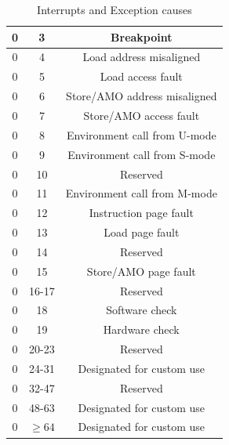 \begin{table}
\begin{tabular}{|c|c|c|}
    \hline
    0                  & 3             & Breakpoint                     \\
    \hline
    0                  & 4             & Load address misaligned        \\
    \hline
    0                  & 5             & Load access fault              \\
    \hline
    0                  & 6             & Store/AMO address misaligned   \\
    \hline
    0                  & 7             & Store/AMO access fault         \\
    \hline
    0                  & 8             & Environment call from U-mode   \\
    \hline
    0                  & 9             & Environment call from S-mode   \\
    \hline
    0                  & 10            & Reserved                       \\
    \hline
    0                  & 11            & Environment call from M-mode   \\
    \hline
    0                  & 12            & Instruction page fault         \\
    \hline
    0                  & 13            & Load page fault                \\
    \hline
    0                  & 14            & Reserved                       \\
    \hline
    0                  & 15            & Store/AMO page fault           \\
    \hline
    0                  & 16-17         & Reserved                       \\
    \hline
    0                  & 18            & Software check                 \\
    \hline
    0                  & 19            & Hardware check                 \\
    \hline
    0                  & 20-23         & Reserved                       \\
    \hline
    0                  & 24-31         & Designated for custom use      \\
    \hline
    0                  & 32-47         & Reserved                       \\
    \hline
    0                  & 48-63         & Designated for custom use      \\
    \hline
    0                  & $\geq 64$     & Designated for custom use      \\
    \hline
  \end{tabular}
  \caption{Interrupts and Exception causes}
  \label{tab:causes}
\end{table}

